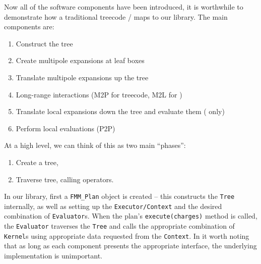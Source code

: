 Now all of the software components have been introduced, it is worthwhile to demonstrate how a traditional treecode / {\fmm} maps to our library. The main components are:

\begin{enumerate}

\item Construct the tree
\item Create multipole expansions at leaf boxes
\item Translate multipole expansions up the tree
\item Long-range interactions (M2P for treecode, M2L for {\fmm})
\item Translate local expansions down the tree and evaluate them ({\fmm} only)
\item Perform local evaluations (P2P)

\end{enumerate}

\noindent
At a high level, we can think of this as two main ``phases'':

\begin{enumerate}

\item Create a tree,
\item Traverse tree, calling operators.

\end{enumerate}

\noindent
In our library, first a {\lstinline|FMM_Plan|} object is created -- this constructs the {\lstinline|Tree|} internally, as well as setting up the {\lstinline|Executor/Context|} and the desired combination of {\lstinline|Evaluator|}s. When the plan's {\lstinline|execute(charges)|} method is called, the {\lstinline|Evaluator|} traverses the {\lstinline|Tree|} and calls the appropriate combination of {\lstinline|Kernel|}s using appropriate data requested from the {\lstinline|Context|}. In it worth noting that as long as each component presents the appropriate interface, the underlying implementation is unimportant.


